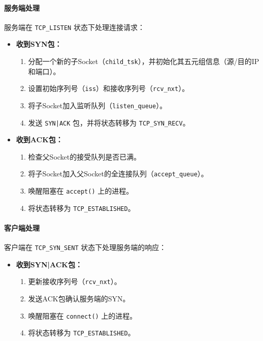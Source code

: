 \documentclass[11pt]{article}
\begin{document}
\paragraph{服务端处理}
服务端在 \texttt{TCP\_LISTEN} 状态下处理连接请求：
\begin{itemize}
    \item \textbf{收到SYN包：} 
    \begin{enumerate}
        \item 分配一个新的子Socket（\texttt{child\_tsk}），并初始化其五元组信息（源/目的IP和端口）。
        \item 设置初始序列号（\texttt{iss}）和接收序列号（\texttt{rcv\_nxt}）。
        \item 将子Socket加入监听队列（\texttt{listen\_queue}）。
        \item 发送 \texttt{SYN|ACK} 包，并将状态转移为 \texttt{TCP\_SYN\_RECV}。
    \end{enumerate}
    \item \textbf{收到ACK包：}
    \begin{enumerate}
        \item 检查父Socket的接受队列是否已满。
        \item 将子Socket加入父Socket的全连接队列（\texttt{accept\_queue}）。
        \item 唤醒阻塞在 \texttt{accept()} 上的进程。
        \item 将状态转移为 \texttt{TCP\_ESTABLISHED}。
    \end{enumerate}
\end{itemize}

\paragraph{客户端处理}
客户端在 \texttt{TCP\_SYN\_SENT} 状态下处理服务端的响应：
\begin{itemize}
    \item \textbf{收到SYN|ACK包：}
    \begin{enumerate}
        \item 更新接收序列号（\texttt{rcv\_nxt}）。
        \item 发送ACK包确认服务端的SYN。
        \item 唤醒阻塞在 \texttt{connect()} 上的进程。
        \item 将状态转移为 \texttt{TCP\_ESTABLISHED}。
    \end{enumerate}
\end{itemize}
\end{document}
